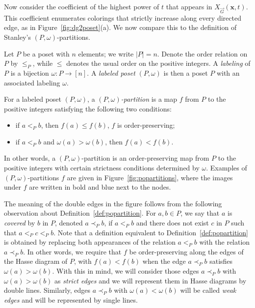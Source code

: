 \documentclass[ALCO,Unicode,published]{cedram}
\newcommand{\diG}{\overrightarrow{G}}
\newcommand{\x}{\mathbf{x}}
\newcommand{\om}{\omega}
\begin{document}
Now consider the coefficient of the highest power of $t$ that appears in $X_{\diG}(\x, t)$.  This coefficient enumerates colorings that strictly increase along every directed edge, as in Figure~\ref{fig:dg2poset}(a).  We now compare this to the definition of Stanley's $(P,\om)$-partitions.

Let $P$ be a poset with $n$ elements; we write $|P|=n$.  Denote the order relation on $P$ by $\leq_P$, while $\leq$ denotes the usual order on the positive integers.  A \emph{labeling} of $P$ is a bijection $\om : P \to [n]$.  A \emph{labeled poset} $(P,\om)$ is then a poset $P$ with an associated labeling $\om$.  

\begin{definition}\label{def:popartition}
For a labeled poset $(P,\om)$, a \emph{$(P,\om)$-partition} is a map $f$ from $P$ to the positive integers satisfying the following two conditions:
\begin{itemize}
\item if $a <_P b$, then $f(a) \leq f(b)$, \ie $f$ is order-preserving;
\item if $a <_P b$ and $\om(a) > \om(b)$, then $f(a) < f(b)$.
\end{itemize}
\end{definition}
In other words, a $(P,\om)$-partition is an order-preserving map from $P$ to the positive integers with certain strictness conditions determined by $\om$.  Examples of $(P,\om)$-partitions $f$ are given in Figure~\ref{fig:popartitions}, where the images under $f$ are written in bold and blue next to the nodes.  

The meaning of the double edges in the figure follows from the following observation about Definition~\ref{def:popartition}.  For $a, b \in P$, we say that $a$ is \emph{covered} by $b$ in $P$, denoted $a \prec_P b$, if $a <_P b$ and there does not exist $c$ in $P$ such that $a <_P c <_P b$.  Note that a definition equivalent to Definition~\ref{def:popartition} is obtained by replacing both appearances of the relation $a <_P b$ with the relation $a \prec_P b$.  In other words, we require that $f$ be order-preserving along the edges of the Hasse diagram of $P$, with $f(a) < f(b)$ when the edge $a \prec_P b$ satisfies $\om(a) > \om(b)$.  With this in mind, we will consider those edges $a \prec_P b$ with $\om(a) > \om(b)$ as \emph{strict edges} and we will represent them in Hasse diagrams by double lines.  Similarly, edges $a \prec_P b$ with $\om(a) < \om(b)$ will be called \emph{weak edges} and will be represented by single lines.  
\end{document}
